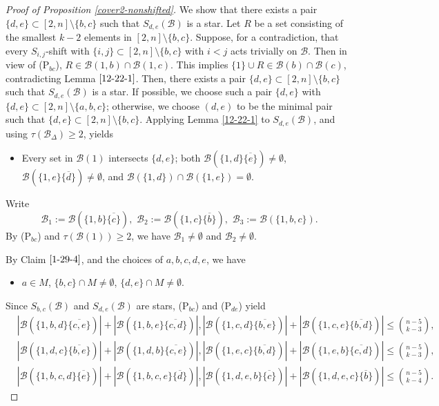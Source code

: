\documentclass[a4paper,11pt]{article}
\newcommand{\m}{\mathcal}
\begin{document}
\begin{proof}[Proof of Proposition \ref{cover2-nonshifted}]
We show that there exists a pair $\{d,e\}\subset [2,n]\setminus \{b,c\}$ such that $S_{d,e}(\m B)$ is a star. Let $R$ be a set consisting of the smallest $k-2$ elements in $[2,n]\setminus \{b,c\}$.
Suppose, for a contradiction, that every $S_{i,j}$-shift with $\{i,j\}\subset [2,n]\setminus \{b,c\}$ with $i<j$ acts trivially on $\m B$. Then in view of (P$_{bc}$), $R\in \m B(1,b)\cap \m B(1,c)$. 
This implies $\{1\}\cup R\in \m B(b)\cap \m B(c)$, contradicting Lemma $\ref{12-22-1}$. 
Then, there exists a pair $\{d,e\}\subset [2,n]\setminus \{b,c\}$ such that $S_{d,e}(\m B)$ is a star.
If possible, we choose such a pair $\{d,e\}$ with
$\{d,e\}\subset [2,n]\setminus\{a,b,c\}$; otherwise, we choose $(d,e)$ to be the minimal pair such that $\{d,e\}\subset [2,n]\setminus\{b,c\}$. 
Applying Lemma \ref{12-22-1} to $S_{d,e}(\mathcal B)$, and using $\tau(\mathcal B_\Delta)\ge2$, yields
\begin{itemize}
    \item[(P$_{de}$)] Every set in $\m B(1)$ intersects $\{d,e\}$; 
both $\m B(\{1,d\}\overline{\{e\}})\ne \emptyset$, $\m B(\{1,e\}\overline{\{d\}})\ne \emptyset$, and 
$\m B(\{1,d\})\cap \m B(\{1,e\})=\emptyset$.
\end{itemize}


Write
$$\m B_1:=\m B(\{1,b\}\overline{\{c\}}),\,\, \m B_2:=\m B(\{1,c\}\overline{\{b\}}),\,\, \m B_3:=\m B(\{1,b,c\}).$$
By (P$_{bc}$) and $\tau(\m B(1))\ge 2$, we have $\m B_1\ne \emptyset$ and $\m B_2\ne \emptyset$.

By Claim $\ref{1-29-4}$, and the choices of $a,b,c,d,e$, we have 
\begin{itemize}
\item[(P$_{M}$)] $a\in M$, $\{b,c\}\cap M\ne \emptyset$, $\{d,e\}\cap M\ne \emptyset$.
\end{itemize}


Since $S_{b,c}(\m B)$ and $S_{d,e}(\m B)$ are stars,  (P$_{bc}$) and (P$_{de}$) yield
\begin{align}
\label{6-5-1}
&|\m B(\{1,b, d\}\overline{\{c,e\}})|+|\m B(\{1,b, e\}\overline{\{c,d\}})|, |\m B(\{1,c, d\}\overline{\{b,e\}})|+|\m B(\{1,c, e\}\overline{\{b,d\}})|\le {n-5\choose k-3},\\ \label{6-17-1}
&|\m B(\{1,d,c\}\overline{\{b,e\}})|+|\m B(\{1,d,b\}\overline{\{c,e\}})|,
|\m B(\{1,e,c\}\overline{\{b,d\}})|+|\m B(\{1,e,b\}\overline{\{c,d\}})|
\le {n-5\choose k-3},\\
\label{6-5-2}
&|\m B(\{1,b,c, d\}\overline{\{e\}})|+|\m B(\{1,b,c, e\}\overline{\{d\}})|, |\m B(\{1,d,e, b\}\overline{\{c\}})|+|\m B(\{1,d,e, c\}\overline{\{b\}})|\le {n-5\choose k-4}.
\end{align}
 

\end{proof}
\end{document}
